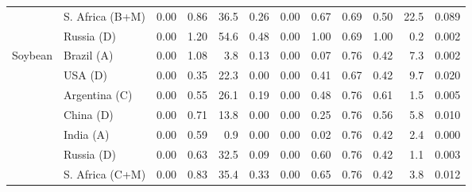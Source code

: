 \begin{tabular}{llrrrrrrrrrr}
 & S. Africa (B+M) & 0.00 & 0.86 & 36.5 & 0.26 & 0.00 & 0.67 & 0.69 & 0.50 & 22.5 & 0.089 \\
 & Russia (D) & 0.00 & 1.20 & 54.6 & 0.48 & 0.00 & 1.00 & 0.69 & 1.00 & 0.2 & 0.002 \\
\midrule
Soybean & Brazil (A) & 0.00 & 1.08 & 3.8 & 0.13 & 0.00 & 0.07 & 0.76 & 0.42 & 7.3 & 0.002 \\
 & USA (D) & 0.00 & 0.35 & 22.3 & 0.00 & 0.00 & 0.41 & 0.67 & 0.42 & 9.7 & 0.020 \\
 & Argentina (C) & 0.00 & 0.55 & 26.1 & 0.19 & 0.00 & 0.48 & 0.76 & 0.61 & 1.5 & 0.005 \\
 & China (D) & 0.00 & 0.71 & 13.8 & 0.00 & 0.00 & 0.25 & 0.76 & 0.56 & 5.8 & 0.010 \\
 & India (A) & 0.00 & 0.59 & 0.9 & 0.00 & 0.00 & 0.02 & 0.76 & 0.42 & 2.4 & 0.000 \\
 & Russia (D) & 0.00 & 0.63 & 32.5 & 0.09 & 0.00 & 0.60 & 0.76 & 0.42 & 1.1 & 0.003 \\
 & S. Africa (C+M) & 0.00 & 0.83 & 35.4 & 0.33 & 0.00 & 0.65 & 0.76 & 0.42 & 3.8 & 0.012 \\
\bottomrule
\end{tabular}
